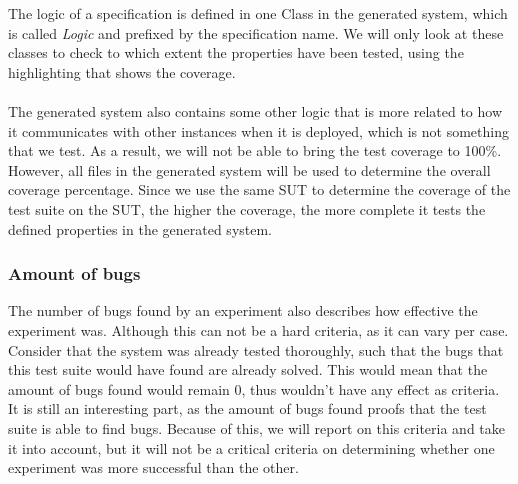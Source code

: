 \FloatBarrier
The logic of a specification is defined in one Class in the generated system, which is called \textit{Logic} and prefixed by the specification name. We will only look at these classes to check to which extent the properties have been tested, using the highlighting that shows the coverage.\\
\\
The generated system also contains some other logic that is more related to how it communicates with other instances when it is deployed, which is not something that we test. As a result, we will not be able to bring the test coverage to 100\%. However, all files in the generated system will be used to determine the overall coverage percentage. Since we use the same SUT to determine the coverage of the test suite on the SUT, the higher the coverage, the more complete it tests the defined properties in the generated system.

\subsubsection{Amount of bugs}
The number of bugs found by an experiment also describes how effective the experiment was. Although this can not be a hard criteria, as it can vary per case. Consider that the system was already tested thoroughly, such that the bugs that this test suite would have found are already solved. This would mean that the amount of bugs found would remain 0, thus wouldn't have any effect as criteria. It is still an interesting part, as the amount of bugs found proofs that the test suite is able to find bugs. Because of this, we will report on this criteria and take it into account, but it will not be a critical criteria on determining whether one experiment was more successful than the other.



